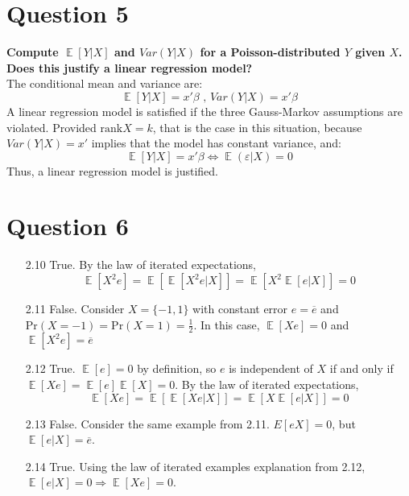 \documentclass{article}
\DeclareMathOperator{\E}{\mathbb{E}}%
\begin{document}
\pagebreak
\section*{Question 5}
\textbf{Compute $\E[Y|X]$ and $Var(Y|X)$ for a Poisson-distributed $Y$ given $X$. Does this justify a linear regression model?}
\bigskip \\
The conditional mean and variance are:
\[
	\E[Y|X]=x'\beta\text{ ,  }Var(Y|X)=x'\beta
\]
A linear regression model is satisfied if the three Gauss-Markov assumptions are violated. Provided $\text{rank}X=k$, that is the case in this situation, because $Var(Y|X)=x'$ implies that the model has constant variance, and:
\[
	\E[Y|X]=x'\beta \iff \E(\varepsilon|X) = 0
\]
Thus, a linear regression model is justified.


\section*{Question 6}
\begin{itemize}
	\item[2.10] True. By the law of iterated expectations,
		\[
			\E[X^2e] = \E[\E[X^2e|X]] = \E[X^2\E[e|X]] = 0
		\]
	\item[2.11] False. Consider $X=\{-1,1\}$ with constant error ${e=\overline{e}}$ and ${\text{Pr}(X=-1)=\text{Pr}(X=1)=\frac{1}{2}}$. In this case, ${\E[Xe]=0}$ and ${\E[X^2e]=\overline{e}}$
	\item[2.12] True. $\E[e]=0$ by definition, so $e$ is independent of $X$ if and only if ${\E[Xe]=\E[e]\E[X]=0}$. By the law of iterated expectations,
		\[
			\E[Xe] = \E[\E[Xe|X]] = \E[X\E[e|X]] = 0
		\]
	\item[2.13] False. Consider the same example from 2.11. $E[eX]=0$, but $\E[e|X]=\overline{e}$.
	\item[2.14] True. Using the law of iterated examples explanation from 2.12, ${\E[e|X]=0\Rightarrow\E[Xe]=0}$.
\end{itemize}


\pagebreak
\end{document}
